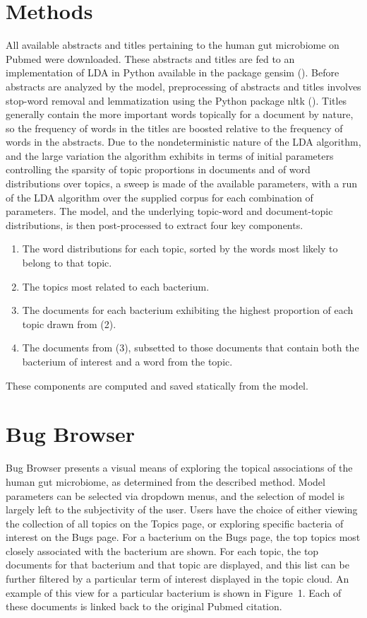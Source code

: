 \documentclass{bioinfo}
\begin{document}
\section{Methods}
All available abstracts and titles pertaining to the human gut microbiome on Pubmed were downloaded. These abstracts and titles are fed to an implementation of LDA in Python available in the package gensim (\citealp{gensim10}). Before abstracts are analyzed by the model, preprocessing of abstracts and titles involves stop-word removal and lemmatization using the Python package nltk (\citealp{nltk09}). Titles generally contain the more important words topically for a document by nature, so the frequency of words in the titles are boosted relative to the frequency of words in the abstracts. Due to the nondeterministic nature of the LDA algorithm, and the large variation the algorithm exhibits in terms of initial parameters controlling the sparsity of topic proportions in documents and of word distributions over topics, a sweep is made of the available parameters, with a run of the LDA algorithm over the supplied corpus for each combination of parameters. The model, and the underlying topic-word and document-topic distributions, is then post-processed to extract four key components. \\
\begin{enumerate}
\item The word distributions for each topic, sorted by the words most likely to belong to that topic.
\item The topics most related to each bacterium.
\item The documents for each bacterium exhibiting the highest proportion of each topic drawn from (2).
\item The documents from (3), subsetted to those documents that contain both the bacterium of interest and a word from the topic.
\end{enumerate}
These components are computed and saved statically from the model. 
\section{Bug Browser}
Bug Browser presents a visual means of exploring the topical associations of the human gut microbiome, as determined from the described method. Model parameters can be selected via dropdown menus, and the selection of model is largely left to the subjectivity of the user. Users have the choice of either viewing the collection of all topics on the Topics page, or exploring specific bacteria of interest on the Bugs page. For a bacterium on the Bugs page, the top topics most closely associated with the bacterium are shown. For each topic, the top documents for that bacterium and that topic are displayed, and this list can be further filtered by a particular term of interest displayed in the topic cloud. An example of this view for a particular bacterium is shown in Figure~1\vphantom{\ref{fig:01}}. Each of these documents is linked back to the original Pubmed citation. 
\end{document}
